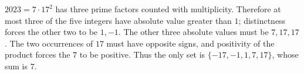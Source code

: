 $ 2023=7\cdot17^2 $ has three prime factors counted with multiplicity. Therefore at most three of the five integers have absolute value greater than $ 1 $; distinctness forces the other two to be $ 1,-1 $. The other three absolute values must be $ 7,17,17 $. The two occurrences of $ 17 $ must have opposite signs, and positivity of the product forces the $ 7 $ to be positive. Thus the only set is $\{-17,-1,1,7,17\}$, whose sum is $\boxed7 $.
